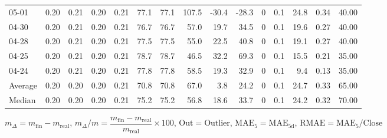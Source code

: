 \begin{threeparttable}
{\begin{tabular}{lrrrrrrrrrrrrrr}
  05-01 &          0.20 &          0.21 &          0.20 &        0.21 &                77.1 &               77.1 &               107.5 &      -30.4 &        -28.3 &              0 &                 0.1 &             24.8 &            0.34 &                  40.00 \\
  04-30 &          0.20 &          0.21 &          0.20 &        0.21 &                76.7 &               76.7 &                57.0 &       19.7 &         34.5 &              0 &                 0.1 &             19.6 &            0.27 &                  40.00 \\
  04-28 &          0.20 &          0.21 &          0.20 &        0.21 &                77.5 &               77.5 &                55.0 &       22.5 &         40.8 &              0 &                 0.1 &             19.1 &            0.27 &                  40.00 \\
  04-25 &          0.20 &          0.21 &          0.20 &        0.21 &                78.7 &               78.7 &                46.5 &       32.2 &         69.3 &              0 &                 0.1 &             15.5 &            0.21 &                  35.00 \\
  04-24 &          0.20 &          0.21 &          0.20 &        0.21 &                77.8 &               77.8 &                58.5 &       19.3 &         32.9 &              0 &                 0.1 &              9.4 &            0.13 &                  35.00 \\
Average &          0.20 &          0.20 &          0.20 &        0.21 &                70.8 &               70.8 &                67.0 &        3.8 &         24.2 &              0 &                 0.1 &             24.7 &            0.33 &                  65.00 \\
 Median &          0.20 &          0.20 &          0.20 &        0.21 &                75.2 &               75.2 &                56.8 &       18.6 &         33.7 &              0 &                 0.1 &             24.2 &            0.32 &                  70.00 \\
\bottomrule
\end{tabular}
}
\begin{tablenotes}\footnotesize
\item $m_\Delta=m_{\text{fin}}-m_{\text{real}}$,
$m_\Delta/m=\dfrac{m_{\text{fin}}-m_{\text{real}}}{m_{\text{real}}}\times100$,
$\mathrm{Out}=\text{Outlier}$,
$\mathrm{MAE}_5=\mathrm{MAE}_{5\text{d}}$,
$\mathrm{RMAE}=\mathrm{MAE}_5/\text{Close}$
\end{tablenotes}
\end{threeparttable}
\endgroup

